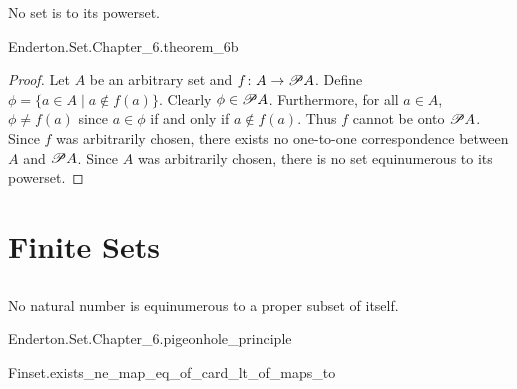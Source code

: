 \documentclass{report}
\begin{document}
  \begin{theorem}[6B]
    No set is  to its powerset.
  \end{theorem}

    {Enderton.Set.Chapter\_6.theorem\_6b}

  \begin{proof}
    Let $A$ be an arbitrary set and $f \colon A \rightarrow \mathscr{P}A$.
    Define $\phi = \{a \in A \mid a \not\in f(a)\}$.
    Clearly $\phi \in \mathscr{P}A$.
    Furthermore, for all $a \in A$, $\phi \neq f(a)$ since $a \in \phi$ if and
      only if $a \not\in f(a)$.
    Thus $f$ cannot be onto $\mathscr{P}A$.
    Since $f$ was arbitrarily chosen, there exists no one-to-one correspondence
      between $A$ and $\mathscr{P}A$.
    Since $A$ was arbitrarily chosen, there is no set equinumerous to its
      powerset.
  \end{proof}

\section{Finite Sets}%

\subsection{}%

  \begin{theorem}
    No natural number is equinumerous to a proper subset of itself.
  \end{theorem}

    {Enderton.Set.Chapter\_6.pigeonhole\_principle}

    {Finset.exists\_ne\_map\_eq\_of\_card\_lt\_of\_maps\_to}
\end{document}
